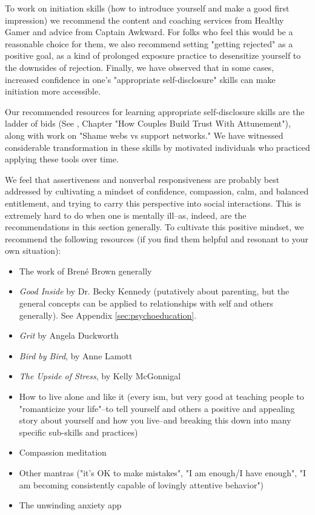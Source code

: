 \documentclass[12pt,letterpaper]{book}
\begin{document}
To work on initiation skills (how to introduce yourself and make a good first impression) we recommend the content and coaching services from Healthy Gamer and advice from Captain Awkward. For folks who feel this would be a reasonable choice for them, we also recommend setting "getting rejected" as a positive goal, as a kind of prolonged exposure practice to desensitize yourself to the downsides of rejection. Finally, we have observed that in some cases, increased confidence in one's "appropriate self-disclosure" skills can make initiation more accessible.

Our recommended resources for learning appropriate self-disclosure skills are the ladder of bids (See \textcite{gottmanTrust}, Chapter "How Couples Build Trust With Attunement"), along with \textcite{brownDaring} work on "Shame webs vs support networks." We have witnessed considerable transformation in these skills by motivated individuals who practiced applying these tools over time.

We feel that assertiveness and nonverbal responsiveness are probably best addressed by cultivating a mindset of confidence, compassion, calm, and balanced entitlement, and trying to carry this perspective into social interactions. This is extremely hard to do when one is mentally ill–as, indeed, are the recommendations in this section generally. To cultivate this positive mindset, we recommend the following resources (if you find them helpful and resonant to your own situation):
\begin{itemize}
	\item The work of Bren{\'e} Brown generally
	\item \textit{Good Inside} by Dr. Becky Kennedy (putatively about parenting, but the general concepts can be applied to relationships with self and others generally). See Appendix \ref{sec:psychoeducation}.
	\item \textit{Grit} by Angela Duckworth
	\item \textit{Bird by Bird}, by Anne Lamott
	\item \textit{The Upside of Stress}, by Kelly McGonnigal
	\item How to live alone and like it (every ism, but very good at teaching people to "romanticize your life"–to tell yourself and others a positive and appealing story about yourself and how you live–and breaking this down into many specific sub-skills and practices)
	\item Compassion meditation
	\item Other mantras ("it's OK to make mistakes", "I am enough/I have enough", "I am becoming consistently capable of lovingly attentive behavior")
	\item The unwinding anxiety app
\end{itemize}
\end{document}
